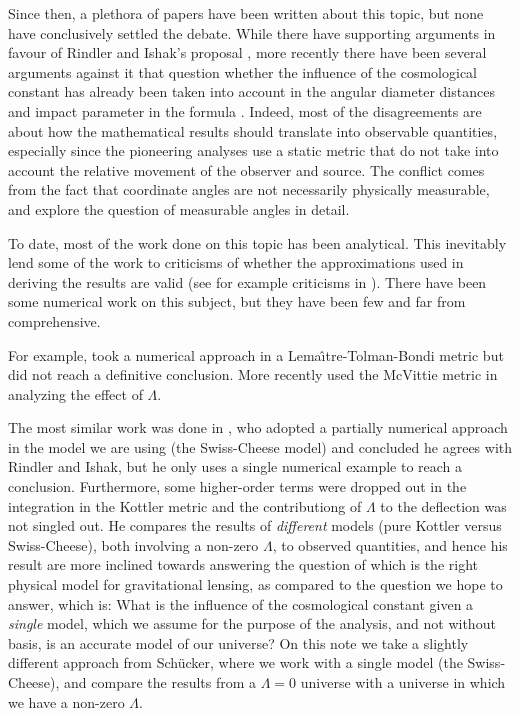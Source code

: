 Since then, a plethora of papers have been written about this topic, but none have conclusively settled the debate. While there have supporting arguments in favour of Rindler and Ishak's proposal \citep{sereno2008influence,bhadra2010gravitational,schucker2008strong}, more recently there have been several arguments against it that question whether the influence of the cosmological constant has already been taken into account in the angular diameter distances and impact parameter in the formula \citep{butcher2016no,piattella2016lensing,arakida2012effect}. Indeed, most of the disagreements are about how the mathematical results should translate into observable quantities, especially since the pioneering analyses use a static metric that do not take into account the relative movement of the observer and source. The conflict comes from the fact that coordinate angles are not necessarily physically measurable, and \citet{lebedev2013influence} explore the question of measurable angles in detail. 

To date, most of the work done on this topic has been analytical. This inevitably lend some of the work to criticisms of whether the approximations used in deriving the results are valid (see for example criticisms in \citet{ishak2010more}). There have been some numerical work on this subject, but they have been few and far from comprehensive. 

For example, \citet{beynon2012testing} took a numerical approach in a Lema{\^\i}tre-Tolman-Bondi metric \citep{lemaitre1997expanding,tolman1934effect,bondi1947spherically} but did not reach a definitive conclusion. More recently \citep{aghili2017effect} used the McVittie metric \citep{mcvittie1933mass} in analyzing the effect of $\Lambda$. 

The most similar work was done in \citet{schucker2009strong}, who adopted a partially numerical approach in the model we are using (the Swiss-Cheese model) and concluded he agrees with Rindler and Ishak, but he only uses a single numerical example to reach a conclusion. Furthermore, some higher-order terms were dropped out in the integration in the Kottler metric and the contributiong of $\Lambda$ to the deflection was not singled out. He compares the results of \emph{different} models (pure Kottler versus Swiss-Cheese), both involving a non-zero $\Lambda$, to observed quantities, and hence his result are more inclined towards answering the question of which is the right physical model for gravitational lensing, as compared to the question we hope to answer, which is: What is the influence of the cosmological constant given a \emph{single} model, which we assume for the purpose of the analysis, and not without basis, is an accurate model of our universe? On this note we take a slightly different approach from Sch{\"u}cker, where we work with a single model (the Swiss-Cheese), and compare the results from a $\Lambda = 0$ universe with a universe in which we have a non-zero $\Lambda$. 

